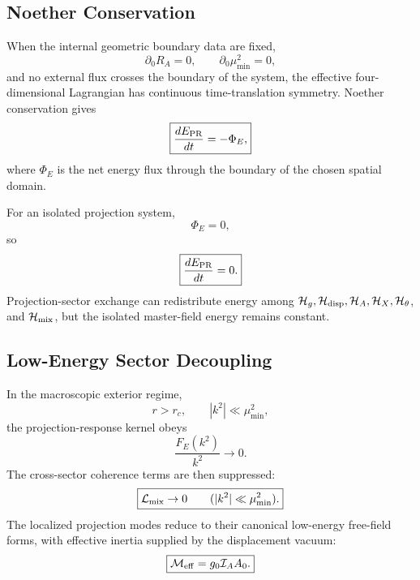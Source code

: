 \documentclass[11pt]{article}
\begin{document}
\subsection{Noether Conservation}

When the internal geometric boundary data are fixed,
\begin{equation}
\boxed{
\partial_0R_A=0,
\qquad
\partial_0\mu_{\min}^2=0,
}
\end{equation}
and no external flux crosses the boundary of the system, the effective
four-dimensional Lagrangian has continuous time-translation symmetry. Noether
conservation gives
\begin{equation}
\boxed{
\frac{dE_{\rm PR}}{dt}
=
-\Phi_E,
}
\end{equation}
where \(\Phi_E\) is the net energy flux through the boundary of the chosen
spatial domain.

For an isolated projection system,
\begin{equation}
\boxed{
\Phi_E=0,
}
\end{equation}
so
\begin{equation}
\boxed{
\frac{dE_{\rm PR}}{dt}=0.
}
\end{equation}
Projection-sector exchange can redistribute energy among
\(\mathcal H_g,\mathcal H_{\rm disp},\mathcal H_A,\mathcal H_X,\mathcal H_\theta\),
and \(\mathcal H_{\rm mix}\), but the isolated master-field energy remains
constant.

\subsection{Low-Energy Sector Decoupling}

In the macroscopic exterior regime,
\begin{equation}
\boxed{
r>r_c,
\qquad
|k^2|\ll\mu_{\min}^2,
}
\end{equation}
the projection-response kernel obeys
\begin{equation}
\boxed{
\frac{F_E(k^2)}{k^2}\rightarrow0.
}
\end{equation}
The cross-sector coherence terms are then suppressed:
\begin{equation}
\boxed{
\mathcal L_{\rm mix}\rightarrow0
\qquad
(|k^2|\ll\mu_{\min}^2).
}
\end{equation}
The localized projection modes reduce to their canonical low-energy free-field
forms, with effective inertia supplied by the displacement vacuum:
\begin{equation}
\boxed{
\mathcal M_{\rm eff}
=
g_0\mathcal I_AA_0.
}
\end{equation}
\end{document}
